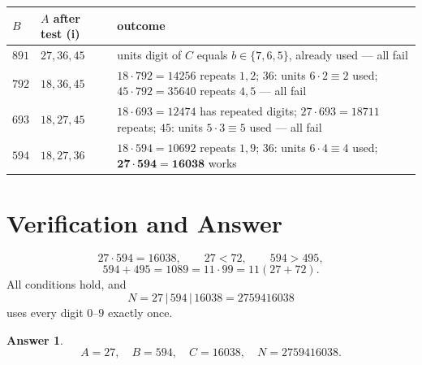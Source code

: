 \documentclass[10pt]{article}
\theoremstyle{definition}
\newtheorem{answer}{Answer}
\begin{document}
\begin{center}
\footnotesize
\begin{tabular}{p{1.0cm}|p{2.5cm}|p{10.8cm}}
$B$ & $A$ after test (i) & outcome \\ \hline
$891$ & $27,36,45$ & units digit of $C$ equals $b\in\{7,6,5\}$, already used --- all fail \\ \hline
$792$ & $18,36,45$ & $18\cdot 792=14256$ repeats $1,2$; $36$: units $6\cdot 2\equiv 2$ used; $45\cdot 792=35640$ repeats $4,5$ --- all fail \\ \hline
$693$ & $18,27,45$ & $18\cdot 693=12474$ has repeated digits; $27\cdot 693=18711$ repeats; $45$: units $5\cdot 3\equiv 5$ used --- all fail \\ \hline
$594$ & $18,27,36$ & $18\cdot 594=10692$ repeats $1,9$; $36$: units $6\cdot 4\equiv 4$ used; $\mathbf{27\cdot 594=16038}$ works
\end{tabular}
\end{center}

\section*{Verification and Answer}
\[
27\cdot 594=16038,\qquad 27<72,\qquad 594>495,
\]
\[
594+495=1089=11\cdot 99=11(27+72).
\]
All conditions hold, and
\[
N=27\,|\,594\,|\,16038=2759416038
\]
uses every digit $0$--$9$ exactly once.

\begin{answer}
\[
\boxed{\;A=27,\quad B=594,\quad C=16038,\quad N=2759416038.\;}
\]
\end{answer}
\end{document}
